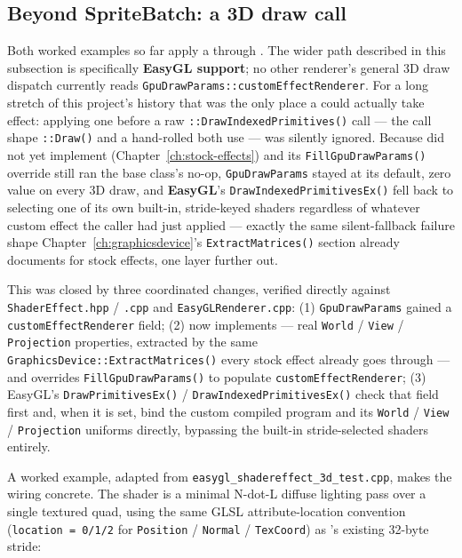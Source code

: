\subsection{Beyond SpriteBatch: a 3D draw call}

Both worked examples so far apply a  through
. The wider path described in this subsection is specifically
\textbf{EasyGL support}; no other renderer's general 3D draw dispatch currently reads
\texttt{GpuDrawParams::customEffectRenderer}. For a long stretch of this project's history that was the only
place a  could actually take effect: applying one before a raw
\allowbreak\texttt{::DrawIndexedPrimitives()} call --- the call
shape \allowbreak\texttt{::Draw()} and a hand-rolled
 both use --- was silently ignored. Because
 did not yet implement 
(Chapter~\ref{ch:stock-effects}) and its \texttt{FillGpuDrawParams()} override still ran
the  base class's no-op, \texttt{GpuDrawParams} stayed at its default,
zero value on every 3D draw, and \textbf{EasyGL}'s
\texttt{DrawIndexedPrimitivesEx()} fell back to selecting one of its own built-in,
stride-keyed shaders regardless of whatever custom effect the caller had just applied ---
exactly the same silent-fallback failure shape Chapter~\ref{ch:graphicsdevice}'s
\texttt{ExtractMatrices()} section already documents for stock effects, one layer further
out.

This was closed by three coordinated changes, verified directly against
\texttt{ShaderEffect.hpp} / \texttt{.cpp} and \texttt{EasyGLRenderer.cpp}: (1)
\texttt{GpuDrawParams} gained a \texttt{customEffectRenderer} field; (2)
 now implements  --- real
\texttt{World} / \texttt{View} / \texttt{Projection} properties, extracted by the same
\texttt{GraphicsDevice::ExtractMatrices()} every stock effect already goes through --- and
overrides \texttt{FillGpuDrawParams()} to populate \texttt{customEffectRenderer}; (3)
EasyGL's \texttt{DrawPrimitivesEx()} / \texttt{DrawIndexedPrimitivesEx()} check that field
first and, when it is set, bind the custom compiled program and its
\texttt{World} / \texttt{View} / \texttt{Projection} uniforms directly, bypassing the
built-in stride-selected shaders entirely.

A worked example, adapted from \texttt{easygl\_shadereffect\_3d\_test.cpp}, makes the
wiring concrete. The shader is a minimal N-dot-L diffuse lighting pass over a single
textured quad, using the same GLSL attribute-location convention (\texttt{location = 0/1/2}
for \texttt{Position} / \texttt{Normal} / \texttt{TexCoord}) as
's existing 32-byte stride:

